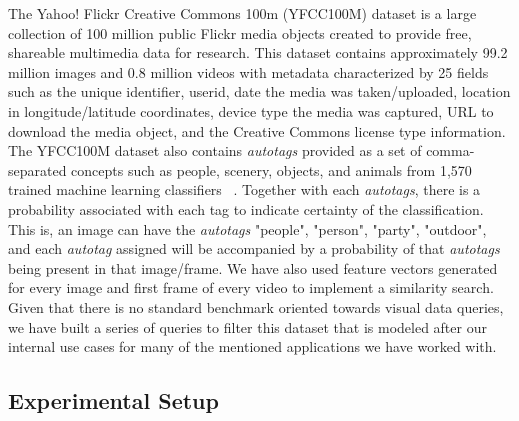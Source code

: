 The Yahoo! Flickr Creative Commons 100m (YFCC100M) dataset is a large
collection of 100 million public Flickr media objects created to provide free,
shareable multimedia data for research. This dataset contains approximately
99.2 million images and 0.8 million videos with metadata characterized by
25 fields such as the unique identifier, userid,
date the media was taken/uploaded, location in longitude/latitude coordinates,
device type the media was captured, URL to download the media object,
and the Creative Commons license type information.
The YFCC100M dataset also contains \textit{autotags}
provided as a set of comma-separated concepts such as people, scenery, objects,
and animals from 1,570 trained machine learning classifiers ~\cite{Thomee_2016}.
Together with each \textit{autotags}, there is a
probability associated with each tag to indicate certainty of the classification.
This is, an image can have the \textit{autotags} "people", "person", "party",
"outdoor", and each \textit{autotag} assigned will be accompanied by a
probability of that \textit{autotags} being present in that image/frame.
We have also used feature vectors generated for every image and first frame
of every video \cite{features} to implement a similarity search.
Given that there is no standard benchmark oriented towards visual data queries,
we have built a series of queries to filter this dataset that is modeled after
our internal use cases for many of the mentioned applications we have worked
with.

\subsection{Experimental Setup}
\label{setup}

